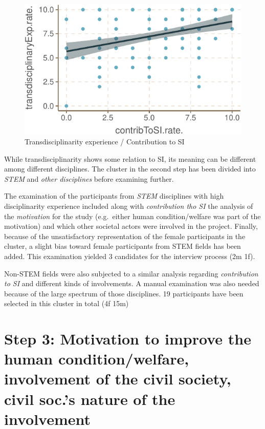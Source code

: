 \documentclass[]{tufte-book}
\begin{document}
\begin{figure}
      
\includegraphics{SIVOCS_int-cand_files/figure-latex/td_si_lm-1}
\caption{Transdisciplinarity experience / Contribution to SI}
\label{fig:td}
\end{figure}

While transdisciplinarity shows some relation to SI, its meaning can be
different among different disciplines. The cluster in the second step
has been divided into \emph{STEM} and \emph{other disciplines} before
examining further.

The examination of the participants from \emph{STEM} disciplines with
high disciplinarity experience included along with \emph{contribution
tho SI} the analysis of the \emph{motivation} for the study (e.g.~either
human condition/welfare was part of the motivation) and which other
societal actors were involved in the project. Finally, because of the
unsatisfactory representation of the female participants in the cluster,
a slight bias toward female participants from STEM fields has been
added. This examination yielded 3 candidates for the interview process
(2m \textbar{} 1f).

Non-STEM fields were also subjected to a similar analysis regarding
\emph{contribution to SI} and different kinds of involvements. A manual
examination was also needed because of the large spectrum of those
disciplines. 19 participants have been selected in this cluster in total
(4f \textbar{} 15m)

\hypertarget{step-3-motivation-to-improve-the-human-conditionwelfare-involvement-of-the-civil-society-civil-soc.s-nature-of-the-involvement}{%
\section{Step 3: Motivation to improve the human condition/welfare,
involvement of the civil society, civil soc.'s nature of the
involvement}\label{step-3-motivation-to-improve-the-human-conditionwelfare-involvement-of-the-civil-society-civil-soc.s-nature-of-the-involvement}}
\end{document}
